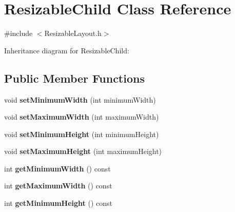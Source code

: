 \hypertarget{class_resizable_child}{}\section{Resizable\+Child Class Reference}
\label{class_resizable_child}


{\ttfamily \#include $<$Resizable\+Layout.\+h$>$}



Inheritance diagram for Resizable\+Child\+:
\subsection*{Public Member Functions}
\begin{DoxyCompactItemize}
\item 
void {\bfseries set\+Minimum\+Width} (int minimum\+Width)\hypertarget{class_resizable_child_a43531c929c933e13b16f15d8d5b966e7}{}\label{class_resizable_child_a43531c929c933e13b16f15d8d5b966e7}

\item 
void {\bfseries set\+Maximum\+Width} (int maximum\+Width)\hypertarget{class_resizable_child_af320c3d8d97e1a29871b83a161970530}{}\label{class_resizable_child_af320c3d8d97e1a29871b83a161970530}

\item 
void {\bfseries set\+Minimum\+Height} (int minimum\+Height)\hypertarget{class_resizable_child_a9a25c9c476e606c79a091ea171fde10d}{}\label{class_resizable_child_a9a25c9c476e606c79a091ea171fde10d}

\item 
void {\bfseries set\+Maximum\+Height} (int maximum\+Height)\hypertarget{class_resizable_child_a2b7b79d443e5d8f9220f9fa2e5a48e3d}{}\label{class_resizable_child_a2b7b79d443e5d8f9220f9fa2e5a48e3d}

\item 
int {\bfseries get\+Minimum\+Width} () const \hypertarget{class_resizable_child_a799c8cf06801b7da7fd6d987892740e1}{}\label{class_resizable_child_a799c8cf06801b7da7fd6d987892740e1}

\item 
int {\bfseries get\+Maximum\+Width} () const \hypertarget{class_resizable_child_a78a85e1a87e5d3c0071c8eb6aa673aab}{}\label{class_resizable_child_a78a85e1a87e5d3c0071c8eb6aa673aab}

\item 
int {\bfseries get\+Minimum\+Height} () const \hypertarget{class_resizable_child_a3dc554161d4b994494326227a96a644c}{}\label{class_resizable_child_a3dc554161d4b994494326227a96a644c}


\end{DoxyCompactItemize}

